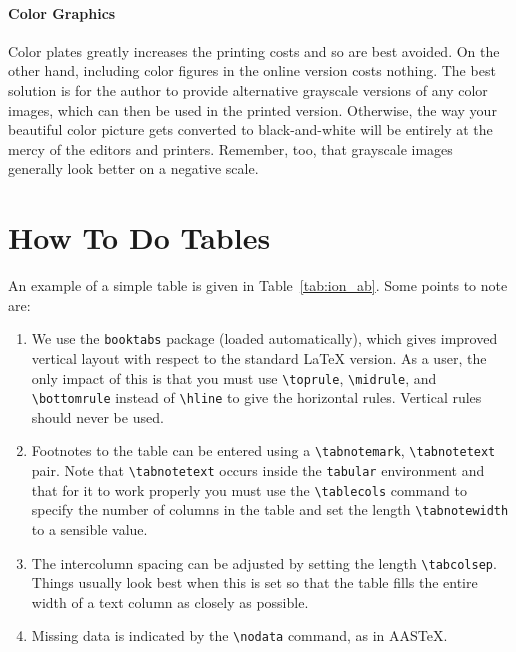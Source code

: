 \documentclass[debug]{rmxaa}
\newcommand{\CS}[1]{\texttt{\textbackslash #1}}
\begin{document}
\paragraph{Color Graphics}

Color plates greatly increases the printing costs and so are best
avoided. On the other hand, including color figures in the online
version costs nothing. The best solution is for the author to provide
alternative grayscale versions of any color images, which can then be
used in the printed version. Otherwise, the way your beautiful color
picture gets converted to black-and-white will be entirely at the
mercy of the editors and printers. Remember, too, that grayscale
images generally look better on a negative scale.

\section{How To Do Tables}
\label{sec:how-do-tables}

An example of a simple table is given in Table~\ref{tab:ion_ab}. Some
points to note are:
\begin{enumerate}
\item We use the \texttt{booktabs} package (loaded automatically),
  which gives improved vertical layout with respect to the standard
  \LaTeX{} version. As a user, the only impact of this is that you
  must use \CS{toprule}, \CS{midrule}, and \CS{bottomrule} instead of
  \CS{hline} to give the horizontal rules. Vertical rules should never
  be used. 
\item Footnotes to the table can be entered using a
  \CS{tabnotemark}, \CS{tabnotetext} pair. Note that \CS{tabnotetext}
  occurs inside the \texttt{tabular} environment and that for it to
  work properly you must use the \CS{tablecols} command to specify the
  number of columns in the table and set the length \CS{tabnotewidth}
  to a sensible value.
\item The intercolumn spacing can be adjusted by setting the length
  \CS{tabcolsep}. Things usually look best when this is set so that
  the table fills the entire width of a text column as closely as
  possible. 
\item Missing data is indicated by the \CS{nodata} command, as in
  AAS\TeX. 
\end{enumerate}
\end{document}
